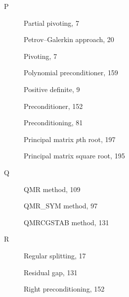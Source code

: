 \begin{description}
\item[P]
{Partial pivoting}, {7}\par

{Petrov--Galerkin approach}, {20}\par

{Pivoting}, {7}\par

{Polynomial preconditioner}, {159}\par

{Positive definite}, {9}\par

{Preconditioner}, {152}\par

{Preconditioning}, {81}\par

{Principal matrix $p$th root}, {197}\par

{Principal matrix square root}, {195}\par

\item[Q]
{QMR method}, {109}\par

{QMR\_SYM method}, {97}\par

{QMRCGSTAB method}, {131}\par

\item[R]
{Regular splitting}, {17}\par

{Residual gap}, {131}\par

{Right preconditioning}, {152}\par


\end{description}
